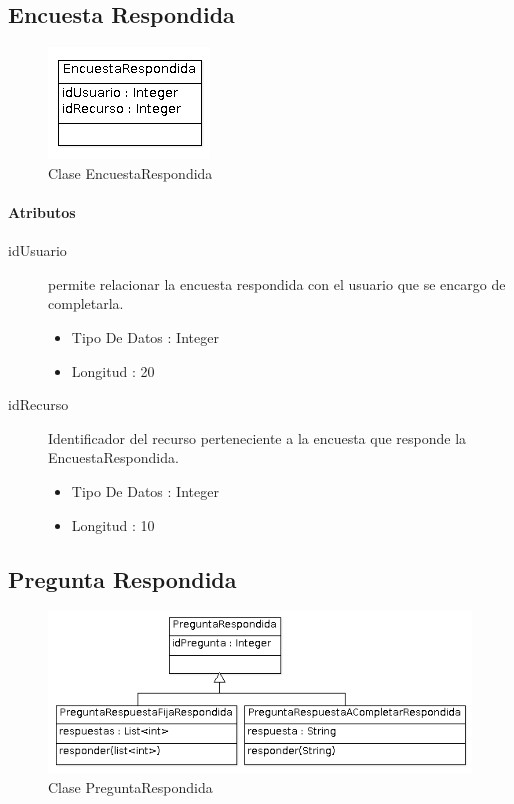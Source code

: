 \documentclass{article}
\begin{document}
\subsection{Encuesta Respondida} 



\begin{figure}[h]
\centering
\includegraphics[scale=0.9]{EncuestaRespondida}

\caption{Clase EncuestaRespondida}
\end{figure}

\paragraph{\large{Atributos}}

\begin{description}
\item[idUsuario] permite relacionar la encuesta respondida con el usuario que se encargo de completarla.
\begin{itemize}
\item Tipo De Datos : Integer
\item Longitud : 20
\end{itemize}

\item[idRecurso] Identificador del recurso perteneciente a la encuesta que responde la EncuestaRespondida.
\begin{itemize}
\item Tipo De Datos : Integer
\item Longitud : 10
\end{itemize} 
\end{description}

\subsection{Pregunta Respondida} 

\begin{figure}[h]
\centering
\includegraphics[scale=0.9]{PreguntaRespondida}

\caption{Clase PreguntaRespondida}
\end{figure}
\end{document}
